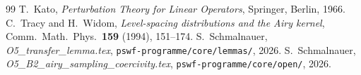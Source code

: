 \documentclass[12pt,a4paper]{amsart}
\theoremstyle{definition}
\begin{document}
\begin{thebibliography}{99}
T.~Kato,
\textit{Perturbation Theory for Linear Operators},
Springer, Berlin, 1966.
C.~Tracy and H.~Widom,
\textit{Level-spacing distributions and the Airy kernel},
Comm.\ Math.\ Phys.\ \textbf{159} (1994), 151--174.
S.~Schmalnauer,
\textit{O5\_transfer\_lemma.tex},
\texttt{pswf-programme/core/lemmas/}, 2026.
S.~Schmalnauer,
\textit{O5\_B2\_airy\_sampling\_coercivity.tex},
\texttt{pswf-programme/core/open/}, 2026.
\end{thebibliography}
\end{document}
